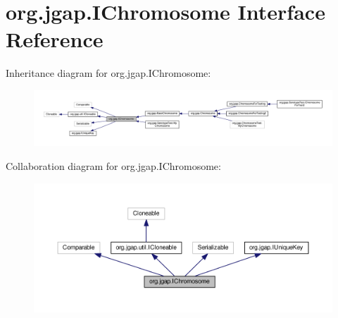 \hypertarget{interfaceorg_1_1jgap_1_1_i_chromosome}{\section{org.\-jgap.\-I\-Chromosome Interface Reference}
\label{interfaceorg_1_1jgap_1_1_i_chromosome}
}


Inheritance diagram for org.\-jgap.\-I\-Chromosome\-:
\nopagebreak
\begin{figure}[H]
\begin{center}
\leavevmode
\includegraphics[width=350pt]{interfaceorg_1_1jgap_1_1_i_chromosome__inherit__graph}
\end{center}
\end{figure}


Collaboration diagram for org.\-jgap.\-I\-Chromosome\-:
\nopagebreak
\begin{figure}[H]
\begin{center}
\leavevmode
\includegraphics[width=350pt]{interfaceorg_1_1jgap_1_1_i_chromosome__coll__graph}
\end{center}
\end{figure}
